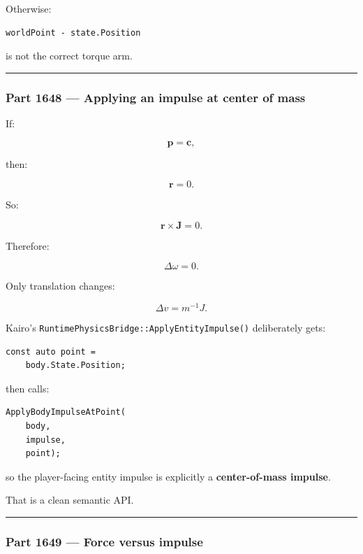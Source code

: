 Otherwise:

\begin{verbatim}
worldPoint - state.Position
\end{verbatim}

is not the correct torque arm.

\begin{center}\rule{0.5\linewidth}{0.5pt}\end{center}

\subsubsection{Part 1648 --- Applying an impulse at center of mass}\label{part-1648-applying-an-impulse-at-center-of-mass}

If:

\[
\mathbf p=\mathbf c,
\]

then:

\[
\mathbf r=0.
\]

So:

\[
\mathbf r\times\mathbf J=0.
\]

Therefore:

\[
\Delta\omega=0.
\]

Only translation changes:

\[
\boxed{
\Delta v=m^{-1}J.
}
\]

Kairo's \texttt{RuntimePhysicsBridge::ApplyEntityImpulse()} deliberately gets:

\begin{verbatim}
const auto point =
    body.State.Position;
\end{verbatim}

then calls:

\begin{verbatim}
ApplyBodyImpulseAtPoint(
    body,
    impulse,
    point);
\end{verbatim}

so the player-facing entity impulse is explicitly a \textbf{center-of-mass impulse}.

That is a clean semantic API.

\begin{center}\rule{0.5\linewidth}{0.5pt}\end{center}

\subsubsection{Part 1649 --- Force versus impulse}\label{part-1649-force-versus-impulse}

